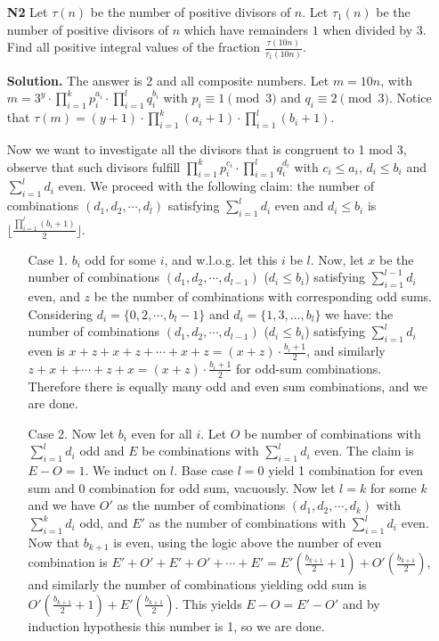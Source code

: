 \documentclass[11pt,a4paper]{article}
\begin{document}
\begin{itemize}
\newpage 

\item[\textbf{N2}]
 Let $\tau(n)$ be the number of positive divisors of $n$. Let $\tau_1(n)$ be the number of positive divisors of $n$ which have remainders $1$ when divided by $3$. Find all positive integral values of the fraction $\frac{\tau(10n)}{\tau_1(10n)}$.

\textbf{Solution.} The answer is 2 and all composite numbers. 
Let $m=10n$, with $m=3^y\cdot\displaystyle\prod_{i=1}^{k}p_i^{a_i}\cdot\displaystyle\prod_{i=1}^{l}q_i^{b_i}$ with $p_i\equiv 1\pmod{3}$ and $q_i\equiv 2\pmod{3}$. 
Notice that $\tau(m)=(y+1)\cdot\displaystyle\prod_{i=1}^{k}(a_i+1)\cdot\displaystyle\prod_{i=1}^{l}(b_i+1)$. 

Now we want to investigate all the divisors that is congruent to 1 mod 3, 
observe that such divisors fulfill 
$\displaystyle\prod_{i=1}^{k}p_i^{c_i}\cdot\displaystyle\prod_{i=1}^{l}q_i^{d_i}$ 
with $c_i\le a_i$, $d_i\le b_i$ and $\displaystyle\sum_{i=1}^{l}d_i$ even. 
We proceed with the following claim: 
the number of combinations $(d_1, d_2, \cdots , d_l)$ satisfying $\displaystyle\sum_{i=1}^{l}d_i$ even and $d_i\le b_i$ is 
$\lfloor\frac{\prod_{i=1}^{l}(b_i+1)}{2} \rfloor$. 
\begin{itemize}
\item[Case 1.] $b_i$ odd for some $i$, and w.l.o.g. let this $i$ be $l$. 
Now, let $x$ be the number of combinations $(d_1, d_2, \cdots , d_{l-1})$ ($d_i\le b_i$) satisfying $\displaystyle\sum_{i=1}^{l-1}d_i$ even, and $z$ be the number of combinations with corresponding odd sums. 
Considering $d_i=\{0, 2, \cdots, b_l-1\}$ and $d_i=\{1,3,\dots , b_l\}$ we have: 
the number of combinations $(d_1, d_2, \cdots , d_{l-1})$ ($d_i\le b_i$) satisfying $\displaystyle\sum_{i=1}^{l}d_i$ even
is $x+z+x+z+\cdots + x+z=(x+z)\cdot\frac{b_i+1}{2}$, 
and similarly $z+x++\cdots +z+x=(x+z)\cdot\frac{b_i+1}{2}$ for odd-sum combinations. 
Therefore there is equally many odd and even sum combinations, and we are done.

\item[Case 2.] Now let $b_i$ even for all $i$. Let $O$ be number of combinations with $\displaystyle\sum_{i=1}^{l}d_i$ odd and $E$ be combinations with $\displaystyle\sum_{i=1}^{l}d_i$ even. The claim is $E-O=1$. 
We induct on $l$. 
Base case $l=0$ yield 1 combination for even sum and 0 combination for odd sum, vacuously. 
Now let $l=k$ for some $k$ and we have $O'$ as the number of combinations $(d_1, d_2, \cdots , d_k)$ with $\displaystyle\sum_{i=1}^{k}d_i$ odd, and $E'$ as the number of combinations with $\displaystyle\sum_{i=1}^{l}d_i$ even. 
Now that $b_{k+1}$ is even, using the logic above the number of even combination is 
$E'+O'+E'+O'+\cdots +E'=E'(\frac{b_{k+1}}{2}+1)+O'(\frac{b_{k+1}}{2})$, 
and similarly the number of combinations yielding odd sum is 
$O'(\frac{b_{k+1}}{2}+1)+E'(\frac{b_{k+1}}{2})$.
This yields $E-O=E'-O'$ and by induction hypothesis this number is 1, so we are done. 
\end{itemize}


\end{itemize}
\end{document}
